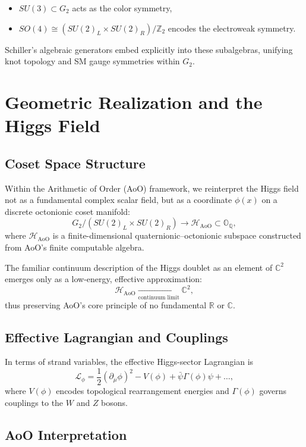 \documentclass[12pt]{article}
\theoremstyle{remark}
\begin{document}
\begin{itemize}
    \item $SU(3) \subset G_2$ acts as the color symmetry,
    \item $SO(4) \cong (SU(2)_L \times SU(2)_R)/\mathbb{Z}_2$ encodes the electroweak symmetry.
\end{itemize}

Schiller’s algebraic generators embed explicitly into these subalgebras, unifying knot topology and SM gauge symmetries within $G_2$.

\section{Geometric Realization and the Higgs Field}

\subsection{Coset Space Structure}

Within the Arithmetic of Order (AoO) framework, we reinterpret the Higgs field not as a fundamental complex scalar field, but as a coordinate \(\phi(x)\) on a discrete octonionic coset manifold:
\[
G_2 / (SU(2)_L \times SU(2)_R) \longrightarrow \mathcal{H}_{\mathrm{AoO}} \subset \mathbb{O}_{\mathbb{Q}},
\]
where \(\mathcal{H}_{\mathrm{AoO}}\) is a finite-dimensional quaternionic–octonionic subspace constructed from AoO's finite computable algebra.

The familiar continuum description of the Higgs doublet as an element of \(\mathbb{C}^2\) emerges only as a low-energy, effective approximation:
\[
\mathcal{H}_{\mathrm{AoO}} \xrightarrow[\text{continuum limit}]{} \mathbb{C}^2,
\]
thus preserving AoO's core principle of no fundamental \(\mathbb{R}\) or \(\mathbb{C}\).

\subsection{Effective Lagrangian and Couplings} 

In terms of strand variables, the effective Higgs-sector Lagrangian is
\[
\mathcal{L}_\phi = \frac{1}{2} (\partial_\mu \phi)^2 - V(\phi) + \bar{\psi} \Gamma(\phi) \psi + \dots,
\]
where $V(\phi)$ encodes topological rearrangement energies and $\Gamma(\phi)$ governs couplings to the $W$ and $Z$ bosons.

\subsection{AoO Interpretation}
\end{document}
